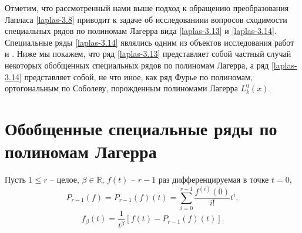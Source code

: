  Отметим, что рассмотренный нами выше подход к обращению преобразования  Лапласа \eqref{laplas-3.8} приводит к задаче об исследованиии вопросов сходимости  специальных рядов по полиномам Лагерра вида \eqref{laplas-3.13} и \eqref{laplas-3.14}. Специальные ряды \eqref{laplas-3.14} являлись одним из объектов исследования работ  \cite{Shar11} и \cite{Shar12}. Ниже мы покажем, что ряд \eqref{laplas-3.13} представляет собой частный случай некоторых обобщенных специальных рядов по полиномам Лагерра, а ряд \eqref{laplas-3.14} представляет собой, не что иное, как ряд Фурье по полиномам, ортогональным по Соболеву, порожденным полиномами Лагерра $L_k^0(x)$.














\section{Обобщенные специальные ряды по полиномам Лагерра}

Пусть $1\le r$ -- целое, $\beta\in \mathbb{R}$, $f(t)$ -- $r-1$ раз дифференцируемая в точке $t=0$,
\begin{equation}\label{laplas-4.1}
  P_{r-1}(f)=P_{r-1}(f)(t)=\sum\limits_{i=0}^{r-1}\frac{f^{(i)}(0)}{i!}t^i,
\end{equation}
\begin{equation}\label{laplas-4.2}
  f_\beta(t)=\frac1{t^\beta}[f(t)-P_{r-1}(f)(t)].
\end{equation}

